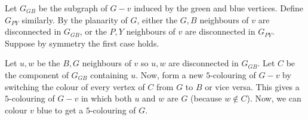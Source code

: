 \begin{Proof}{}{}
\begin{figure}[H]
\begin{tikzpicture}[x=0.75pt,y=0.75pt,yscale=-1,xscale=1]
        \end{tikzpicture}

    \end{figure}

    Let $ G_{GB} $ be the subgraph
    of $ G-v $ induced by the green and blue vertices. Define $ G_{PY} $
    similarly. By the planarity of $ G $, either the $ G,B $
    neighbours of $ v $ are disconnected in $ G_{GB} $, or the $ P,Y $
    neighbours of $ v $ are disconnected in $ G_{PY} $. Suppose by
    symmetry the first case holds.

    Let $ u,w $ be the $ B,G $ neighbours of $ v $ so $ u,w $ are disconnected
    in $ G_{GB} $. Let $ C $ be the component of $ G_{GB} $ containing
    $ u $. Now, form a new $ 5 $-colouring of $ G-v $ by switching
    the colour of every vertex of $ C $ from $ G $ to $ B $ or vice versa.
    This gives a $ 5 $-colouring of $ G-v $ in which both $ u $ and $ w $
    are $ G $ (because $ w\notin C $). Now, we can colour $ v $
    blue to get a $ 5 $-colouring of $ G $.
\end{Proof}
